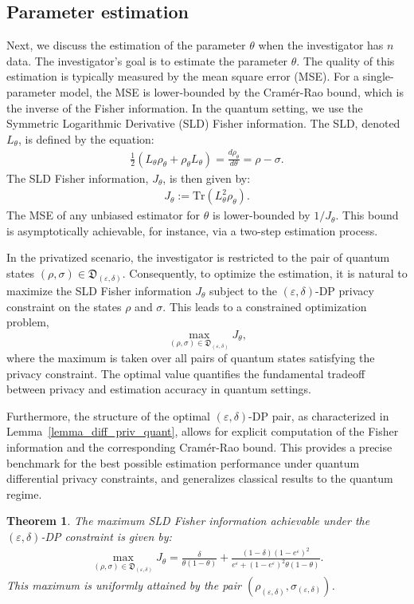 \documentclass[onecolumn,ldraftcls, 11pt]{IEEEtran}
\newtheorem{theorem}{\bf{Theorem}}
\newcommand{\tr}{\mathrm{Tr}}
\newcommand{\eps}{\varepsilon}
\begin{document}
\subsection{Parameter estimation}
Next, we discuss the estimation of the parameter 
$\theta$ when the investigator has $n$ data.
The investigator's goal is to estimate the parameter $\theta$. 
The quality of this estimation is typically measured by the mean square error (MSE). 
For a single-parameter model, the MSE is lower-bounded by the Cramér-Rao bound, which is the inverse of the Fisher information. In the quantum setting, we use the Symmetric Logarithmic Derivative (SLD) Fisher information. The SLD, denoted $L_\theta$, is defined by the equation:
\begin{align}
\frac{1}{2} (L_\theta \rho_\theta + \rho_\theta L_\theta) = \frac{d \rho_\theta}{d\theta} = \rho-\sigma.
\end{align}
The SLD Fisher information, $J_\theta$, is then given by:
\begin{align}
J_\theta := \tr(L_\theta^2 \rho_\theta).
\end{align}
The MSE of any unbiased estimator for $\theta$ is lower-bounded by $1/J_\theta$. This bound is asymptotically achievable, for instance, via a two-step estimation process. 


In the privatized scenario, the investigator is restricted to the pair of quantum states $(\rho,\sigma) \in \mathfrak{D}_{(\eps,\delta)}$.
Consequently, 
to optimize the estimation, it is natural to maximize the SLD Fisher information $J_\theta$ subject to the $(\eps,\delta)$-DP privacy constraint on the states $\rho$ and $\sigma$.
This leads to a constrained optimization problem,
\[
\max_{(\rho,\sigma) \in \mathfrak{D}_{(\eps,\delta)}} J_\theta,
\]
where the maximum is taken over all pairs of quantum states satisfying the privacy constraint. The optimal value quantifies the fundamental tradeoff between privacy and estimation accuracy in quantum settings.

Furthermore, the structure of the optimal $(\eps,\delta)$-DP pair, as characterized in Lemma~\ref{lemma_diff_priv_quant}, allows for explicit computation of the Fisher information and the corresponding Cramér-Rao bound. This provides a precise benchmark for the best possible estimation performance under quantum differential privacy constraints, and generalizes classical results to the quantum regime.


\begin{theorem}\label{theo_fisher_info_bound}
The maximum SLD Fisher information achievable under the $(\eps,\delta)$-DP constraint is given by:
\begin{align}
\max_{(\rho,\sigma) \in \mathfrak{D}_{(\eps,\delta)}} J_\theta = \frac{\delta}{\theta(1-\theta)} + \frac{(1-\delta)(1-e^\eps)^2}{e^\eps + (1-e^\eps)^2 \theta(1-\theta)}.\label{XM3}
\end{align}
This maximum is uniformly attained by the pair $(\rho_{(\eps,\delta)}, \sigma_{(\eps,\delta)})$.
\end{theorem}
\end{document}
